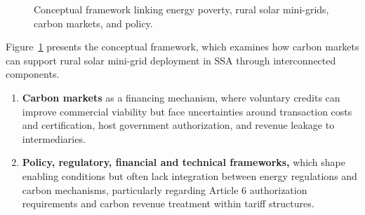 \begin{figure}[t]
\caption{Conceptual framework linking energy poverty, rural solar mini-grids, carbon markets, and policy.}
\label{fig:concept}
\end{figure}

Figure~\ref{fig:concept} presents the conceptual framework, which examines how carbon markets can support rural solar mini-grid deployment in SSA through interconnected components.

\begin{enumerate}
	\item \textbf{Carbon markets} as a financing mechanism, where voluntary credits can improve commercial viability but face uncertainties around transaction costs and certification, host government authorization, and revenue leakage to intermediaries.~\cite{kreibich2021,michaelowa-evolution,ahonen-governance}
	\item \textbf{Policy, regulatory, financial and technical frameworks,} which shape enabling conditions but often lack integration between energy regulations and carbon mechanisms, particularly regarding Article 6 authorization requirements and carbon revenue treatment within tariff structures.~\cite{esmap2019,bhattacharyya2016,schneider-integrity}
\end{enumerate}


